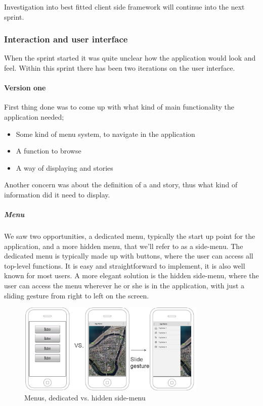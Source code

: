 \documentclass[11pt]{book}
\begin{document}
Investigation into best fitted client side framework will continue into the next sprint.

\subsubsection{Interaction and user interface}
When the sprint started it was quite unclear how the application would look and feel. Within this sprint there has been two iterations on the user interface.

\paragraph{Version one}

First thing done was to come up with what kind of main functionality the application needed;

\begin{itemize}
    \item Some kind of menu system, to navigate in the application
    \item A function to browse \wallentityp
    \item A way of displaying \wallentityp and stories
\end{itemize}

Another concern was about the definition of a \wallentitys and story, thus what kind of information did it need to display.

\subparagraph{Menu}
We saw two opportunities, a dedicated menu, typically the start up point for the application, and a more hidden menu, that we'll refer to as a side-menu. The dedicated menu is typically made up with buttons, where the user can access all top-level functions. It is easy and straightforward to implement, it is also well known for most users. A more elegant solution is the hidden side-menu, where the user can access the menu wherever he or she is in the application, with just a sliding gesture from right to left on the screen.

\begin{figure}[H]
    \centering
    \includegraphics[width=0.8\textwidth]{Figures/Phases/Sprint1/versiononeSliding.png}
    \caption{Menus, dedicated vs. hidden side-menu}
    \label{fig:phases_sprint1_uiVersionOneMenu}
\end{figure}
\end{document}

